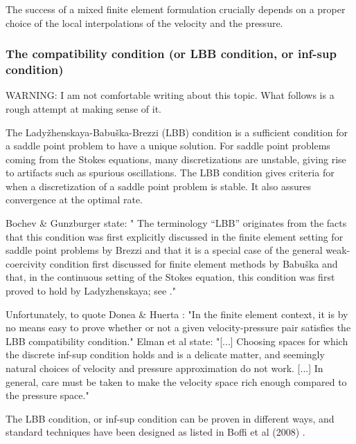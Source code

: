 

The success of a mixed finite element formulation crucially depends on a proper choice of the local interpolations of the velocity and the pressure. 

\subsubsection{The compatibility condition (or LBB condition, or inf-sup condition)} \label{ss:LBBcond}
 

WARNING: I am not comfortable writing about this topic. What follows is a rough attempt at making sense of it.


The Lady{\v z}henskaya-Babu{\v s}ka-Brezzi (LBB) condition is a sufficient 
condition for a saddle point problem to have a unique solution.
For saddle point problems coming from the Stokes equations, 
many discretizations are unstable, giving rise to artifacts such as spurious oscillations. 
The LBB condition gives criteria for when a discretization of a saddle point problem is stable. 
It also assures convergence at the optimal rate. 

Bochev \& Gunzburger \cite{bogu09} state: "
The terminology “LBB” originates from the facts that this condition was first explicitly discussed
in the finite element setting for saddle point problems by Brezzi \cite{brez74} and that it is a special case of
the general weak-coercivity condition first discussed for finite element methods by Babu{\v s}ka
\cite{babu71} and that, in the continuous setting of the Stokes equation, this condition was first proved to
hold by Ladyzhenskaya; see \cite{lady69}."

Unfortunately, to quote Donea \& Huerta \cite{dohu03}: 
"In the finite element context, it is by no means easy to prove whether or not a given
velocity-pressure pair satisfies the LBB compatibility condition."
Elman et al state: "[...] Choosing spaces for which the discrete inf-sup condition holds
and is a delicate matter, and seemingly natural choices of velocity and pressure approximation
do not work. [...] In general, care must be taken to make the velocity space 
rich enough compared to the pressure space."

The LBB condition, or inf-sup condition can be proven in different ways, and standard techniques have been designed
as listed in Boffi et al (2008) \cite{bobf08}.

